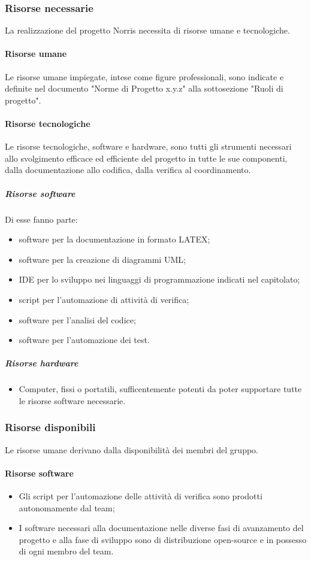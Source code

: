 	\subsubsection{Risorse necessarie}
	La realizzazione del progetto Norris necessita di risorse umane e tecnologiche.
	\paragraph{Risorse umane}
		Le risorse umane impiegate, intese come figure professionali, sono indicate e definite nel documento "Norme di Progetto x.y.z" alla sottosezione "Ruoli di progetto".
	\paragraph{Risorse tecnologiche}
		Le risorse tecnologiche, software e hardware, sono tutti gli strumenti necessari allo svolgimento efficace ed efficiente del progetto in tutte le sue componenti, dalla documentazione allo codifica, dalla verifica al coordinamento.
		\subparagraph{Risorse software}
		Di esse fanno parte:
			\begin{itemize}
				\item software per la documentazione in formato LATEX;
				\item software per la creazione di diagrammi UML;
				\item IDE per lo sviluppo nei linguaggi di programmazione indicati nel capitolato;
				\item script per l'automazione di attività di verifica;
				\item software per l'analisi del codice;
				\item software per l'automazione dei test.
			\end{itemize}
		\subparagraph{Risorse hardware}
			\begin{itemize}
				\item Computer, fissi o portatili, sufficentemente potenti da poter supportare tutte le risorse software necessarie.
			\end{itemize}
	\subsubsection{Risorse disponibili}
	Le risorse umane derivano dalla disponibilità dei membri del gruppo.
	\paragraph{Risorse software}
		\begin{itemize}
			\item Gli script per l'automazione delle attività di verifica sono prodotti autonomamente dal team;
			\item I software necessari alla documentazione nelle diverse fasi di avanzamento  del progetto e alla fase di sviluppo sono di distribuzione open-source e in possesso di ogni membro del team.
		\end{itemize}
